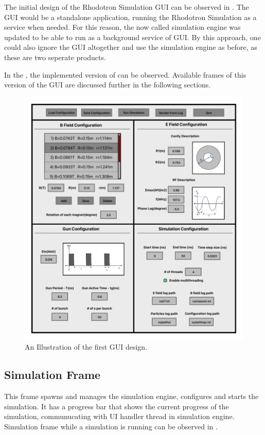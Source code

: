 \documentclass[a4paper,oneside,12pt]{report}
\numberwithin{equation}{chapter}
\begin{document}
{The initial design of the Rhodotron Simulation GUI can be observed in .
The GUI would be a standalone application, running the Rhodotron Simulation as a service when needed. 
For this reason, the now called simulation engine was updated to be able to run as a background service of GUI.
By this approach, one could also ignore the GUI altogether and use the simulation engine as before, as these are two seperate products.

In the , the implemented version of  can be observed. 
Available frames of this version of the GUI are discussed further in the following sections.
\vspace{-10pt}
\begin{figure}[H]
    \centering
    \includegraphics[width=\linewidth]{./figures/illustrations/RhodoSim_GUI_Draft_V02.pdf}
    \vspace{-20pt}
    \caption{An Illustration of the first GUI design.}
    \label{fig:gui_illustration}
\end{figure}

\subsection{Simulation Frame}
This frame spawns and manages the simulation engine, configures and starts the simulation. 
It has a progress bar that shows the current progress of the simulation, communucating with UI handler thread in simulation engine.
Simulation frame while a simulation is running can be observed in .

}
\end{document}
